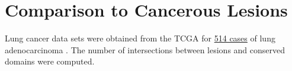 \section*{Comparison to Cancerous Lesions}

Lung cancer data sets were obtained from the \gls{TCGA} for
\href{https://tcga-data.nci.nih.gov/tcga/tcgaCancerDetails.jsp?diseaseType=LUAD&diseaseName=Lung\%20adenocarcinoma}{514 cases}
of lung adenocarcinoma \citep{cerami2012,gao2013}.  The number of intersections between lesions and conserved domains were computed.

